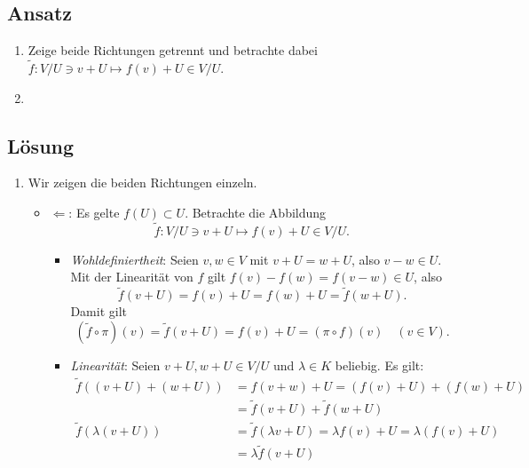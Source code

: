 \subsection{Ansatz}
\begin{enumerate}
	\item Zeige beide Richtungen getrennt und betrachte dabei \( \widetilde{f}: V/U \ni v+U \mapsto f(v) + U \in V/U \).
	\item  
\end{enumerate}

\subsection{Lösung}
\begin{enumerate}
	\item Wir zeigen die beiden Richtungen einzeln.
	\begin{itemize}
	 	\item \( \Leftarrow \): Es gelte \( f(U) \subset U \). Betrachte die Abbildung
	 	\begin{equation*}
	 		\widetilde{f}: V/U \ni v+U \mapsto f(v) + U \in V/U\text{.}
	 	\end{equation*}
	 	\begin{itemize}
	 		\item \emph{Wohldefiniertheit}: Seien \( v,w \in V \) mit \( v+U = w+U \), also \( v-w \in U \). Mit der Linearität von \( f \) gilt \( f(v) - f(w) = f(v-w) \in U \), also
	 		\begin{equation*}
	 		 	\widetilde{f}(v+U) = f(v) + U = f(w) + U = \widetilde{f}(w+U)\text{.}
	 		 \end{equation*} 
	 		 Damit gilt
	 		 \begin{equation*}
	 		 	(\widetilde{f} \circ \pi)(v) = \widetilde{f}(v+U) = f(v) + U = (\pi \circ f)(v) \quad (v \in V)\text{.}
	 		 \end{equation*}
	 		 \item \emph{Linearität}: Seien \( v+U, w+U \in V/U \) und \( \lambda \in K \) beliebig. Es gilt:
	 		 \begin{align*}
	 		 	\widetilde{f}((v+U) + (w+U)) &= f(v+w) + U = (f(v) + U) + (f(w) + U) \\
	 		 		&= \widetilde{f}(v+U) + \widetilde{f}(w+U) \\
	 		 	\widetilde{f}(\lambda(v+U)) &= \widetilde{f}(\lambda v + U) = \lambda f(v) + U = \lambda(f(v) + U) \\
	 		 		&= \lambda\widetilde{f}(v+U)
	 		 \end{align*}
	 	\end{itemize}


\end{itemize}
\end{enumerate}
